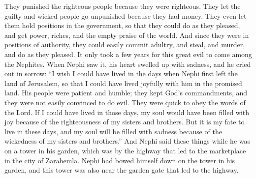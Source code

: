 They punished the righteous people because they were righteous. They let the guilty and wicked people go unpunished because they had money. They even let them hold positions in the government, so that they could do as they pleased, and get power, riches, and the empty praise of the world.  And since they were in positions of authority, they could easily commit adultry, and steal, and murder, and do as they pleased.
\bverse \iffalse Now this great iniquity had come upon the Nephites, in the space of not many years; and when Nephi saw it, his heart was swollen with sorrow within his breast; and he did exclaim in the agony of his soul: \fi
It only took a few years for this great evil to come among the Nephites. When Nephi saw it, his heart swelled up with sadness, and he cried out in sorrow:
\bverse \iffalse Oh, that I could have had my days in the days when my father Nephi first came out of the land of Jerusalem, that I could have joyed with him in the promised land; then were his people easy to be entreated, firm to keep the commandments of God, and slow to be led to do iniquity; and they were quick to hearken unto the words of the Lord-- \fi
``I wish I could have lived in the days when Nephi first left the land of Jerusalem, so that I could have lived joyfully with him in the promised land. His people were patient and humble; they kept God's commandments, and they were not easily convinced to do evil. They were quick to obey the words of the Lord.
\bverse \iffalse Yea, if my days could have been in those days, then would my soul have had joy in the righteousness of my brethren. \fi
If I could have lived in those days, my soul would have been filled with joy because of the righteousness of my sisters and brothers.
\bverse \iffalse But behold, I am consigned that these are my days, and that my soul shall be filled with sorrow because of this the wickedness of my brethren. \fi
But it is my fate to live in these days, and my soul will be filled with sadness because of the wickedness of my sisters and brothers.''
\bverse \iffalse And behold, now it came to pass that it was upon a tower, which was in the garden of Nephi, which was by the highway which led to the chief market, which was in the city of Zarahemla; therefore, Nephi had bowed himself upon the tower which was in his garden, which tower was also near unto the garden gate by which led the highway. \fi
And Nephi said these things while he was on a tower in his garden, which was by the highway that led to the marketplace in the city of Zarahemla. Nephi had bowed himself down on the tower in his garden, and this tower was also near the garden gate that led to the highway.
